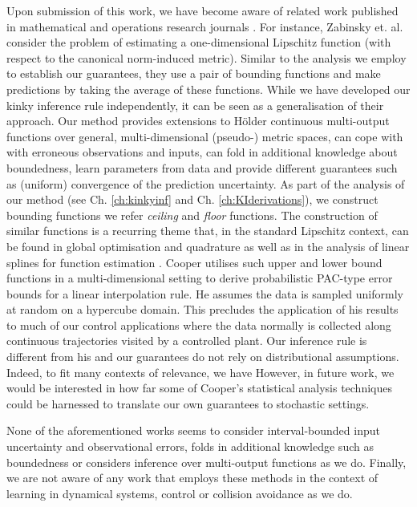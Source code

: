  Upon submission of this work, we have become aware of related work published in mathematical and operations research journals \cite{Cooper2006,Cooper1995,Zabinsky2003}. For instance, Zabinsky et. al. \cite{Zabinsky2003} consider the problem of estimating a one-dimensional Lipschitz function (with respect to the canonical norm-induced metric). Similar to the analysis we employ to establish our guarantees, they use a pair of bounding functions and make predictions by taking the average of these functions. While we have developed our kinky inference rule independently, it can be seen as a generalisation of their approach. Our method provides extensions to H\"older continuous multi-output functions over general, multi-dimensional (pseudo-) metric spaces, can cope with with erroneous observations and inputs, can fold in additional knowledge about boundedness, learn parameters from data and provide different guarantees such as (uniform) convergence of the prediction uncertainty. 
As part of the analysis of our method (see Ch. \ref{ch:kinkyinf} and Ch. \ref{ch:KIderivations}), we construct bounding functions we refer \textit{ceiling} and \textit{floor} functions. The construction of similar functions is a recurring theme that, in the standard Lipschitz context, can be found in global optimisation \cite{Shubert:72} and quadrature \cite{Baran2008} as well as in the analysis of linear splines for function estimation \cite{Cooper1995}. Cooper \cite{Cooper2006,Cooper1995} utilises such upper and lower bound functions in a multi-dimensional setting to derive probabilistic PAC-type error bounds \cite{Valiant1984} for a linear interpolation rule. He assumes the data is sampled uniformly at random on a hypercube domain. This precludes the application of his results to much of our control applications where the data normally is collected along continuous trajectories visited by a controlled plant. Our inference rule is different from his and our guarantees do not rely on distributional assumptions. Indeed, to fit many contexts of relevance, we have  However, in future work, we would be interested in how far some of Cooper's statistical analysis techniques could be harnessed to translate our own guarantees to stochastic settings.

None of the aforementioned works seems to consider interval-bounded input uncertainty and observational errors, folds in additional knowledge such as boundedness or considers inference over multi-output functions as we do.
Finally, we are not aware of any work that employs these methods in the context of learning in dynamical systems, control or collision avoidance as we do. 

